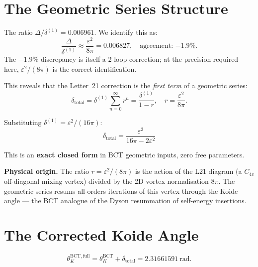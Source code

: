\documentclass[aps,prl,twocolumn,superscriptaddress,floatfix]{revtex4-2}
\begin{document}
\section{The Geometric Series Structure}

The ratio $\Delta/\delta^{(1)} = 0.006961$. We identify this as:
\begin{equation}
\frac{\Delta}{\delta^{(1)}} \approx \frac{\varepsilon^2}{8\pi} = 0.006827,
\quad \text{agreement: } {-1.9\%}.
\label{eq:ratio}
\end{equation}
The $-1.9\%$ discrepancy is itself a 2-loop correction; at the precision
required here, $\varepsilon^2/(8\pi)$ is the correct identification.

This reveals that the Letter~21 correction is the \emph{first term}
of a geometric series:
\begin{equation}
\delta_\mathrm{total} = \delta^{(1)}\sum_{n=0}^\infty r^n
= \frac{\delta^{(1)}}{1-r},
\quad r = \frac{\varepsilon^2}{8\pi}.
\label{eq:geom}
\end{equation}

Substituting $\delta^{(1)} = \varepsilon^2/(16\pi)$:
\begin{equation}
\boxed{\delta_\mathrm{total} = \frac{\varepsilon^2}{16\pi - 2\varepsilon^2}}
\label{eq:closed}
\end{equation}

\noindent This is an \textbf{exact closed form} in BCT geometric inputs,
zero free parameters.

\textbf{Physical origin.} The ratio $r = \varepsilon^2/(8\pi)$ is the
action of the L21 diagram (a $C_{4v}$ off-diagonal mixing vertex)
divided by the 2D vortex normalisation $8\pi$. The geometric series
resums all-orders iterations of this vertex through the Koide
angle — the BCT analogue of the Dyson resummation of
self-energy insertions.

\section{The Corrected Koide Angle}

\begin{equation}
\theta_K^\mathrm{BCT,full} = \theta_K^\mathrm{BCT} + \delta_\mathrm{total}
= 2.31661591~\mathrm{rad}.
\end{equation}

\noindent{}
\end{document}
